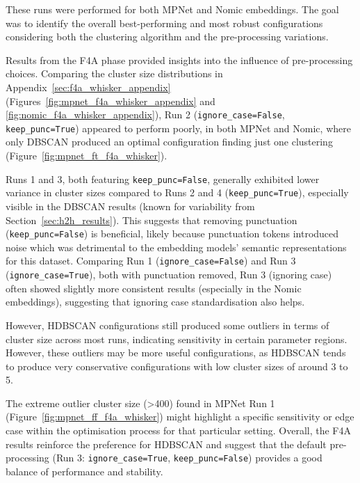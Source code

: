 \documentclass[10pt,oneside]{report}
\begin{document}
\noindent These runs were performed for both MPNet and Nomic embeddings. The goal was to identify the overall best-performing and most robust configurations considering both the clustering algorithm and the pre-processing variations.

Results from the F4A phase provided insights into the influence of pre-processing choices. Comparing the cluster size distributions in Appendix~\ref{sec:f4a_whisker_appendix} (Figures~\ref{fig:mpnet_f4a_whisker_appendix} and \ref{fig:nomic_f4a_whisker_appendix}), Run 2 (\texttt{ignore\_case=False}, \texttt{keep\_punc=True}) appeared to perform poorly, in both MPNet and Nomic, where only DBSCAN produced an optimal configuration finding just one clustering (Figure~\ref{fig:mpnet_ft_f4a_whisker}).

Runs 1 and 3, both featuring \texttt{keep\_punc=False}, generally exhibited lower variance in cluster sizes compared to Runs 2 and 4 (\texttt{keep\_punc=True}), especially visible in the DBSCAN results (known for variability from Section~\ref{sec:h2h_results}). This suggests that removing punctuation (\texttt{keep\_punc=False}) is beneficial, likely because punctuation tokens introduced noise which was detrimental to the embedding models' semantic representations for this dataset. Comparing Run 1 (\texttt{ignore\_case=False}) and Run 3 (\texttt{ignore\_case=True}), both with punctuation removed, Run 3 (ignoring case) often showed slightly more consistent results (especially in the Nomic embeddings), suggesting that ignoring case standardisation also helps.

However, HDBSCAN configurations still produced some outliers in terms of cluster size across most runs, indicating sensitivity in certain parameter regions. However, these outliers may be more useful configurations, as HDBSCAN tends to produce very conservative configurations with low cluster sizes of around 3 to 5.

The extreme outlier cluster size (>400) found in MPNet Run 1 (Figure~\ref{fig:mpnet_ff_f4a_whisker}) might highlight a specific sensitivity or edge case within the optimisation process for that particular setting. Overall, the F4A results reinforce the preference for HDBSCAN and suggest that the default pre-processing (Run 3: \texttt{ignore\_case=True}, \texttt{keep\_punc=False}) provides a good balance of performance and stability.
\end{document}
